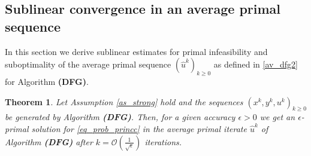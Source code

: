 \documentclass{gOMS2e}
\theoremstyle{plain}
\newtheorem{theorem}{Theorem}[section]
\theoremstyle{definition}
\theoremstyle{remark}
\begin{document}
\subsection{Sublinear convergence in an average  primal sequence}
\label{sec_dfgav} \noindent In this section we derive sublinear
estimates for primal infeasibility and suboptimality of the average
primal sequence $(\hat u^k)_{k \ge 0}$ as defined in \eqref{av_dfg2}
for Algorithm \textbf{(DFG)}. 

\begin{theorem}
\label{th_dfgav} Let Assumption \ref{as_strong} hold and the
sequences $\left(x^k, y^k, u^k\right)_{k\geq 0}$ be generated by
Algorithm {\bf (DFG)}.  Then, for a given accuracy $\epsilon>0$ we
get an $\epsilon$-primal solution for \eqref{eq_prob_princc} in the
average primal iterate  $\hat u^k$ of Algorithm \textbf{(DFG)} after
$k = {\mathcal O} (\frac{1}{\sqrt{\epsilon}})$ iterations.
\end{theorem}
\end{document}
